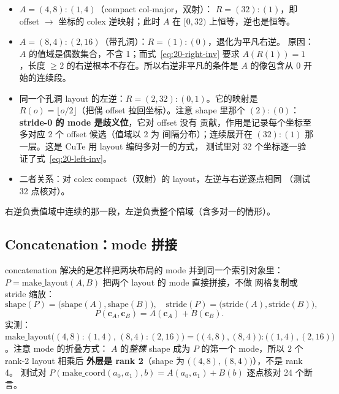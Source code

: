 \begin{itemize}
  \item $A=(4,8){:}(1,4)$（compact col-major，双射）：
        $R=(32){:}(1)$，即 offset $\to$ 坐标的 colex 逆映射；此时
        $A$ 在 $[0,32)$ 上恒等，逆也是恒等。
  \item $A=(8,4){:}(2,16)$（带孔洞）：$R=(1){:}(0)$，退化为平凡右逆。
        原因：$A$ 的值域是偶数集合，不含 1；而式~\eqref{eq:20-right-inv} 要求
        $A(R(1))=1$，长度 $\ge2$ 的右逆根本不存在。所以右逆非平凡的条件是
        $A$ 的像包含从 0 开始的连续段。
  \item 同一个孔洞 layout 的左逆：$R=(2,32){:}(0,1)$。它的映射是
        $R(o)=\lfloor o/2\rfloor$（把偶 offset 拉回坐标）。注意 shape 里那个
        $(2){:}(0)$：\textbf{stride-0 的 mode 是歧义位}，它对 offset 没有
        贡献，作用是记录每个坐标至多对应 2 个 offset 候选（值域以 2 为
        间隔分布）；连续展开在 $(32){:}(1)$ 那一层。这是 CuTe 用
        layout 编码多对一的方式，
        测试里对 32 个坐标逐一验证了式~\eqref{eq:20-left-inv}。
  \item 二者关系：对 colex compact（双射）的 layout，左逆与右逆逐点相同
        （测试 32 点核对）。
\end{itemize}

右逆负责值域中连续的那一段，左逆负责整个陪域（含多对一的情形）。

\subsection{Concatenation：mode 拼接}

concatenation 解决的是怎样把两块布局的 mode 并到同一个索引对象里：
$P=\mathrm{make\_layout}(A,B)$ 把两个 layout 的 mode 直接拼接，不做
网格复制或 stride 缩放：
\begin{equation}
  \mathrm{shape}(P)=\bigl(\mathrm{shape}(A),\mathrm{shape}(B)\bigr),\quad
  \mathrm{stride}(P)=\bigl(\mathrm{stride}(A),\mathrm{stride}(B)\bigr),
  \label{eq:20-concat-shape}
\end{equation}
\begin{equation}
  P(\mathbf{c}_A,\mathbf{c}_B) = A(\mathbf{c}_A) + B(\mathbf{c}_B) .
  \label{eq:20-concat}
\end{equation}
实测：$\mathrm{make\_layout}\bigl((4,8){:}(1,4),\,(8,4){:}(2,16)\bigr)
= \bigl((4,8),(8,4)\bigr){:}\bigl((1,4),(2,16)\bigr)$。注意 mode 的折叠方式：
$A$ 的\emph{整棵} shape 成为 $P$ 的第一个 mode，所以 $2$ 个 rank-2 layout 相乘后
\textbf{外层是 rank 2}（shape 为 $\bigl((4,8),(8,4)\bigr)$），不是 rank 4。
测试对 $P(\mathrm{make\_coord}(a_0,a_1),b)=A(a_0,a_1)+B(b)$ 逐点核对 24 个断言。

